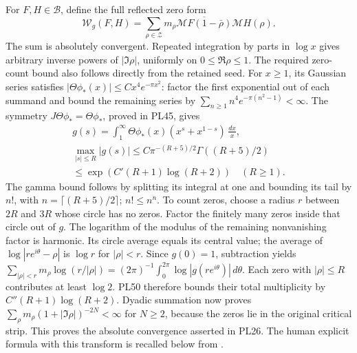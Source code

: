 For \(F,H\in\mathscr B\), define the full reflected zero form
\[
 \mathcal W_g(F,H)=
 \sum_{\rho\in\mathscr Z}m_\rho
    \overline{\mathcal M F(1-\bar\rho)}\mathcal M H(\rho).
 \tag{PL26}\label{pl:pl:Weil}
\]
The sum is absolutely convergent. Repeated integration by parts in
\(\log x\) gives arbitrary inverse powers of \(|\Im\rho|\), uniformly
on \(0\le\Re\rho\le1\). The required zero-count bound also follows
directly from the retained seed. For \(x\ge1\), its Gaussian series
satisfies \(|\Theta\phi_*(x)|\le Cx^4e^{-\pi x^2}\): factor the first
exponential out of each summand and bound the remaining series by
\(\sum_{n\ge1}n^4e^{-\pi(n^2-1)}<\infty\).
The symmetry \(J\Theta\phi_*=\Theta\phi_*\), proved in PL45, gives
\[
 \begin{gathered}
 g(s)=\int_1^\infty\Theta\phi_*(x)(x^s+x^{1-s})\,\frac{dx}{x},
 \\
 \max_{|s|\le R}|g(s)|
 \le C\pi^{-(R+5)/2}\Gamma((R+5)/2)
 \\
 \le \exp(C'(R+1)\log(R+2))\quad(R\ge1).
 \end{gathered}
 \tag{PL50}\label{pl:pl:g-growth}
\]
The gamma bound follows by splitting its integral at one and
bounding its tail by \(n!\), with \(n=\lceil(R+5)/2\rceil\);
\(n!\le n^n\). To count zeros, choose a radius \(r\) between
\(2R\) and \(3R\) whose circle has no zeros. Factor the finitely
many zeros inside that circle out of \(g\). The logarithm of the
modulus of the remaining nonvanishing factor is harmonic.
Its circle average equals its central value; the average of
\(\log|re^{i\theta}-\rho|\) is \(\log r\) for \(|\rho|<r\).
Since \(g(0)=1\), subtraction yields
\(\sum_{|\rho|<r}m_\rho\log(r/|\rho|)
=(2\pi)^{-1}\int_0^{2\pi}\log|g(re^{i\theta})|\,d\theta\).
Each zero with \(|\rho|\le R\) contributes at least \(\log2\).
PL50 therefore bounds their total multiplicity by
\(C''(R+1)\log(R+2)\).
Dyadic summation now proves
\(\sum_\rho m_\rho(1+|\Im\rho|)^{-2N}<\infty\) for \(N\ge2\),
because the zeros lie in the original critical strip.
This proves the absolute convergence asserted in PL26.
The human explicit formula with this transform is recalled below
from \cite{PLConnes}.

